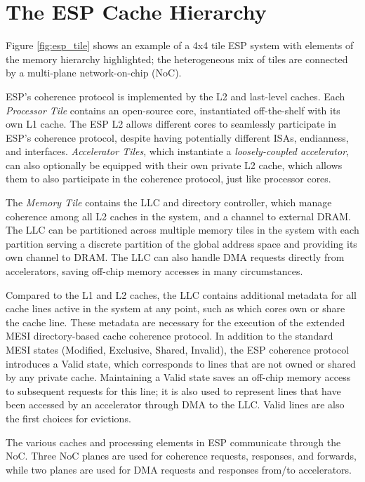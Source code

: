 \section{The ESP Cache Hierarchy}
\label{sec:cache}

Figure \ref{fig:esp_tile} shows an example of a 4x4 tile ESP system with
elements of the memory hierarchy highlighted; the heterogeneous mix of tiles are
connected by a multi-plane network-on-chip (NoC).

ESP's coherence protocol is implemented by the L2 and last-level caches.  Each
\emph{Processor Tile} contains an open-source core, instantiated off-the-shelf
with its own L1 cache. The ESP L2 allows different cores to seamlessly
participate in ESP's coherence protocol, despite having potentially different
ISAs, endianness, and interfaces.  \emph{Accelerator Tiles}, which instantiate
a \emph{loosely-coupled accelerator}, can also optionally be equipped with
their own private L2 cache, which allows them to also participate in the
coherence protocol, just like processor cores.

The \emph{Memory Tile} contains the LLC and directory controller, which manage
coherence among all L2 caches in the system, and a channel to external DRAM.
The LLC can be partitioned across multiple memory tiles in the system with each
partition serving a discrete partition of the global address space and
providing its own channel to DRAM. The LLC can also handle DMA requests
directly from accelerators, saving off-chip memory accesses in many
circumstances.

\par Compared to the L1 and L2 caches, the LLC contains additional metadata for
all cache lines active in the system at any point, such as which cores own or
share the cache line. These metadata are necessary for the execution of the
extended MESI directory-based cache coherence protocol.  In addition to the
standard MESI states (Modified, Exclusive, Shared, Invalid), the ESP coherence
protocol introduces a Valid state, which corresponds to lines that are not
owned or shared by any private cache. Maintaining a Valid state saves an
off-chip memory access to subsequent requests for this line; it is also used to
represent lines that have been accessed by an accelerator through DMA to the
LLC. Valid lines are also the first choices for evictions.

The various caches and processing elements in ESP communicate through the NoC.
Three NoC planes are used for coherence requests, responses, and forwards,
while two planes are used for DMA requests and responses from/to accelerators.


